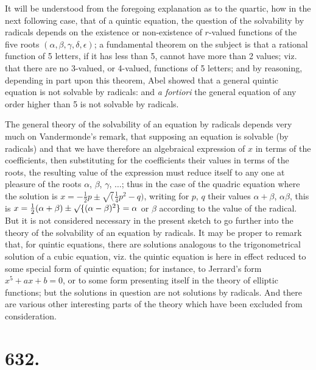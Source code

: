 \documentclass[11pt,a4paper]{book}
\begin{document}
It will be understood from the foregoing explanation as to the quartic, how in the next following case, that of a quintic equation, the question of the solvability by radicals depends on the existence or non-existence of $r$-valued functions of the five roots $(\alpha, \beta, \gamma, \delta, \epsilon)$; a fundamental theorem on the subject is that a rational function of 5 letters, if it has less than 5, cannot have more than 2 values; viz. that there are no 3-valued, or 4-valued, functions of 5 letters; and by reasoning, depending in part upon this theorem, Abel showed that a general quintic equation is not solvable by radicals: and \textit{a fortiori} the general equation of any order higher than 5 is not solvable by radicals.

The general theory of the solvability of an equation by radicals depends very much on Vandermonde's remark, that supposing an equation is solvable (by radicals) and that we have therefore an algebraical expression of $x$ in terms of the coefficients, then substituting for the coefficients their values in terms of the roots, the resulting value of the expression must reduce itself to any one at pleasure of the roots $\alpha$, $\beta$, $\gamma$, $\ldots$; thus in the case of the quadric equation where the solution is $x = -\frac{1}{2}p \pm \surd(\frac{1}{4}p^2 - q)$, writing for $p$, $q$ their values $\alpha + \beta$, $\alpha\beta$, this is $x = \frac{1}{2}(\alpha + \beta) \pm \surd\{(\alpha - \beta)^2\} = \alpha$ or $\beta$ according to the value of the radical. But it is not considered necessary in the present sketch to go further into the theory of the solvability of an equation by radicals. It may be proper to remark that, for quintic equations, there are solutions analogous to the trigonometrical solution of a cubic equation, viz. the quintic equation is here in effect reduced to some special form of quintic equation; for instance, to Jerrard's form $x^5 + ax + b = 0$, or to some form presenting itself in the theory of elliptic functions; but the solutions in question are not solutions by radicals. And there are various other interesting parts of the theory which have been excluded from consideration.

\clearpage
\setcounter{page}{12}

\section*{632.}
\end{document}
